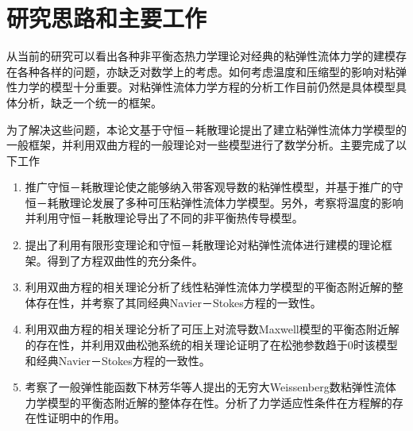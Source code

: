 \documentclass{article}
\begin{document}
\section{研究思路和主要工作}
从当前的研究可以看出各种非平衡态热力学理论对经典的粘弹性流体力学的建模存在各种各样的问题，亦缺乏对数学上的考虑。如何考虑温度和压缩型的影响对粘弹性力学的模型十分重要。对粘弹性流体力学方程的分析工作目前仍然是具体模型具体分析，缺乏一个统一的框架。

为了解决这些问题，本论文基于守恒－耗散理论提出了建立粘弹性流体力学模型的一般框架，并利用双曲方程的一般理论对一些模型进行了数学分析。主要完成了以下工作
\begin{enumerate}
\item 推广守恒－耗散理论使之能够纳入带客观导数的粘弹性模型，并基于推广的守恒－耗散理论发展了多种可压粘弹性流体力学模型。另外，考察将温度的影响并利用守恒－耗散理论导出了不同的非平衡热传导模型。
\item 提出了利用有限形变理论和守恒－耗散理论对粘弹性流体进行建模的理论框架。得到了方程双曲性的充分条件。
\item 利用双曲方程的相关理论分析了线性粘弹性流体力学模型的平衡态附近解的整体存在性，并考察了其同经典Navier－Stokes方程的一致性。
\item 利用双曲方程的相关理论分析了可压上对流导数Maxwell模型的平衡态附近解的存在性，并利用双曲松弛系统的相关理论证明了在松弛参数趋于0时该模型和经典Navier－Stokes方程的一致性。
\item 考察了一般弹性能函数下林芳华等人提出的无穷大Weissenberg数粘弹性流体力学模型的平衡态附近解的整体存在性。分析了力学适应性条件在方程解的存在性证明中的作用。
\end{enumerate}
\end{document}
